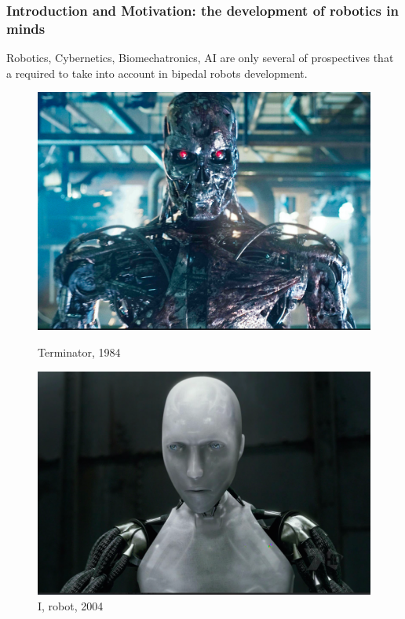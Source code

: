 \documentclass{beamer}
\begin{document}

	\begin{frame}
		\frametitle{Introduction and Motivation: the development of robotics in minds}
		\centering
		Robotics, Cybernetics, Biomechatronics, AI are only several of prospectives that a required to take into account in bipedal robots development.
		
		\begin{figure}[h!]
			\begin{minipage}[H]{0.45\linewidth}
				\includegraphics[width=\linewidth]{presentation_images/3}
				\caption{Terminator, 1984}
			\end{minipage}
			\hfill
			\begin{minipage}[H]{0.45\linewidth}
				\includegraphics[width=\linewidth]{presentation_images/5}
				\caption{I, robot, 2004}
			\end{minipage}
		\end{figure}
	\end{frame}
\end{document}
